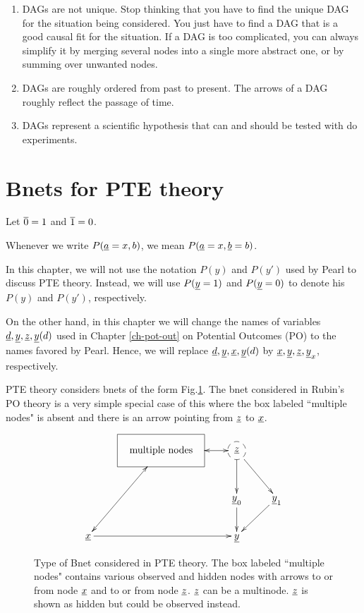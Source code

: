 \begin{enumerate}

\item DAGs are not unique. Stop thinking that you have to find the unique
    DAG for the situation being considered. You just have to find a DAG
    that is a good causal fit for the situation. If a DAG is too
    complicated, you can always simplify it by merging several nodes into a
    single more abstract one, or by summing over unwanted nodes.

\item DAGs are roughly ordered from past to present. The arrows of a DAG
    roughly reflect the passage of time.

\item DAGs represent a scientific hypothesis that can and should be tested
    with do experiments.
\end{enumerate}



\section{Bnets for PTE theory}
\quad

Let $\overline{0}=1$ and $\overline{1}=0$.

Whenever we write $P({\underline{a}}=x, b)$,
we mean $P({\underline{a}}=x, {\underline{b}}=b)$.

In this chapter, we will
not use the notation
$P(y)$ and $P(y')$
used by Pearl to
discuss PTE theory.
Instead, we will
use $P({\underline{y}}=1)$ and
$P({\underline{y}}=0)$
to denote his
$P(y)$ and $P(y')$, respectively.


On the other hand,
in this chapter
we will change the names
of variables ${\underline{d}}, {\underline{y}}, {\underline{z}}, {\underline{y}}(d)$
used
in Chapter \ref{ch-pot-out} on Potential
Outcomes (PO)
to the names favored by Pearl.
Hence, we will replace
${\underline{d}}, {\underline{y}}, {\underline{x}}, {\underline{y}}(d)$
by
${\underline{x}}, {\underline{y}}, {\underline{z}}, {\underline{y}}_x$,
respectively.



PTE theory considers bnets of the form
Fig.\ref{fig-pte-bnet}.
The bnet considered in Rubin's
PO theory
is a very simple special case
of this where the box
labeled ``multiple nodes"
is absent and there is an
arrow pointing
from ${\underline{z}}$ to ${\underline{x}}$.


\begin{figure}[h!]
$$
\xymatrix{
&*++++[F]{\text{multiple nodes}}\ar@{<->}[ldd]
\ar@{<->}[r]
&*++[F-o]{\rvz}\ar[rd]\ar[d]
\\
&&\rvy_0\ar[d]
&\rvy_1\ar[ld]
\\
\rvx\ar[rr]
&&\rvy
}$$
\caption{Type of Bnet
considered in PTE theory.
The box labeled ``multiple nodes"
contains various observed
and hidden nodes with
arrows
to or from node ${\underline{x}}$
and to or from
node ${\underline{z}}$.
${\underline{z}}$ can be a multinode.
${\underline{z}}$
is shown
as hidden but
could be observed instead.
}
\label{fig-pte-bnet}
\end{figure}

